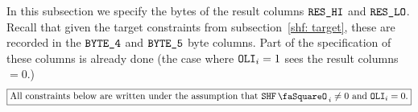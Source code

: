 In this subsection we specify the bytes of the result columns $\texttt{RES}\texttt{\_HI}$ and $\texttt{RES}\texttt{\_LO}$.
Recall that given the target constraints from subsection~\ref{shf: target}, these are recorded in the $\texttt{BYTE}\texttt{\_4}$ and $\texttt{BYTE}\texttt{\_5}$ byte columns.
Part of the specification of these columns is already done (the case where $\texttt{OLI}_{i} = 1$ sees the result columns $=0$.)
\[
	\boxed{\text{All constraints below are written under the assumption that }\shfStamp_{i}\neq 0\text{ and }\oli_{i} = 0.}
\]

